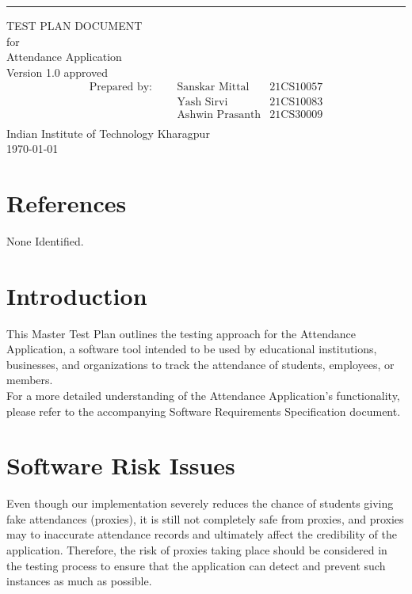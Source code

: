 \documentclass{scrreprt}
\date{}
\def\myversion{1.0 }
\begin{document}
\begin{flushright}
    \rule{16cm}{5pt}\vskip1cm
    \begin{bfseries}
        \Huge{TEST PLAN DOCUMENT}\\
        \vspace{1cm}
        for\\
        \vspace{1cm}
        Attendance Application\\
        \vspace{1cm}
        \LARGE{Version \myversion approved}\\
        \vspace{0cm}
        \begin{align*}
        \text{Prepared by: } \;\;\;\; 
         &\text{Sanskar Mittal} &\text{21CS10057}\\
         &\text{Yash Sirvi} &\text{21CS10083}\\
         &\text{Ashwin Prasanth} &\text{21CS30009}\\
        \end{align*}
        \vspace{1.9cm}
        Indian Institute of Technology Kharagpur\\
        \vspace{1.9cm}
        \today\\
    \end{bfseries}
\end{flushright}

\tableofcontents

\pagebreak

\chapter{References}
None Identified.

\chapter{Introduction}
This Master Test Plan outlines the testing approach for the Attendance Application, a software tool intended to be used by educational institutions, businesses, and organizations to track the attendance of students, employees, or
members.\\
For a more detailed understanding of the Attendance Application's functionality, please refer to the accompanying Software Requirements Specification document.

\chapter{Software Risk Issues}
Even though our implementation severely reduces the chance of students giving fake attendances (proxies), it is still not completely safe from proxies,  and proxies may to inaccurate attendance records and ultimately affect the credibility of the application. Therefore, the risk of proxies taking place should be considered in the testing process to ensure that the application can detect and prevent such instances as much as possible.
\end{document}
